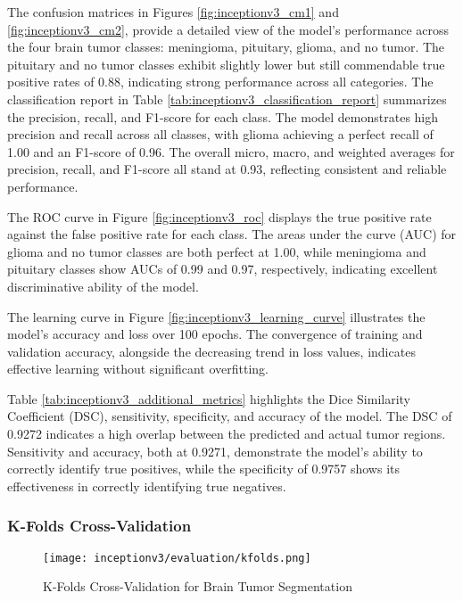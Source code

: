 The confusion matrices in Figures \ref{fig:inceptionv3_cm1} and \ref{fig:inceptionv3_cm2}, provide a detailed view of the model's performance across the four brain tumor classes: meningioma, pituitary, glioma, and no tumor. The pituitary and no tumor classes exhibit slightly lower but still commendable true positive rates of 0.88, indicating strong performance across all categories. The classification report in Table \ref{tab:inceptionv3_classification_report} summarizes the precision, recall, and F1-score for each class. The model demonstrates high precision and recall across all classes, with glioma achieving a perfect recall of 1.00 and an F1-score of 0.96. The overall micro, macro, and weighted averages for precision, recall, and F1-score all stand at 0.93, reflecting consistent and reliable performance.

The ROC curve in Figure \ref{fig:inceptionv3_roc} displays the true positive rate against the false positive rate for each class. The areas under the curve (AUC) for glioma and no tumor classes are both perfect at 1.00, while meningioma and pituitary classes show AUCs of 0.99 and 0.97, respectively, indicating excellent discriminative ability of the model.

The learning curve in Figure \ref{fig:inceptionv3_learning_curve} illustrates the model's accuracy and loss over 100 epochs. The convergence of training and validation accuracy, alongside the decreasing trend in loss values, indicates effective learning without significant overfitting.

Table \ref{tab:inceptionv3_additional_metrics} highlights the Dice Similarity Coefficient (DSC), sensitivity, specificity, and accuracy of the model. The DSC of 0.9272 indicates a high overlap between the predicted and actual tumor regions. Sensitivity and accuracy, both at 0.9271, demonstrate the model's ability to correctly identify true positives, while the specificity of 0.9757 shows its effectiveness in correctly identifying true negatives.

\subsubsection{K-Folds Cross-Validation}

\begin{figure}[H]
  \begin{center}
    \texttt{[image: inceptionv3/evaluation/kfolds.png]}
  \end{center}
  \caption{K-Folds Cross-Validation for Brain Tumor Segmentation}\label{f:inceptionv3_kfolds}
\end{figure}

